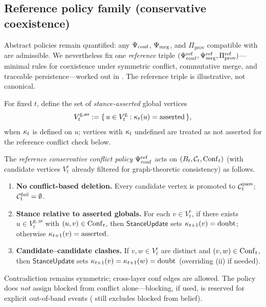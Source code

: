\subsection{Reference policy family (conservative coexistence)}
\label{sec:reference-policies}

Abstract policies remain quantified: any $\Psi_{\mathrm{conf}}$, $\Psi_{\mathrm{mrg}}$, and $\Pi_{\mathrm{prov}}$ compatible with  are admissible.
We nevertheless fix one \emph{reference} triple $(\Psi_{\mathrm{conf}}^{\mathrm{ref}},\Psi_{\mathrm{mrg}}^{\mathrm{ref}},\Pi_{\mathrm{prov}}^{\mathrm{ref}})$---minimal rules for coexistence under symmetric conflict, commutative merge, and traceable persistence---worked out in .
The reference triple is illustrative, not canonical.

\begin{definition}
\label{def:asserted-globals}
For fixed $t$, define the set of \emph{stance-asserted} global vertices
\[
  V^{\mathrm{g,as}}_t := \{\, u\in V^{\mathrm{g}}_t : \kappa_t(u)=\mathrm{asserted}\,\},
\]
when $\kappa_t$ is defined on $u$; vertices with $\kappa_t$ undefined are treated as not asserted for the reference conflict check below.
\end{definition}

\begin{definition}
\label{def:ref-conflict}
The \emph{reference conservative conflict policy} $\Psi_{\mathrm{conf}}^{\mathrm{ref}}$ acts on $(B_t,\mathcal{C}_t,\mathrm{Conf}_t)$ (with candidate vertices $V^{\mathrm{c}}_t$ already filtered for graph-theoretic consistency) as follows.
\begin{enumerate}[label=(\roman*),leftmargin=*]
  \item \textbf{No conflict-based deletion.} Every candidate vertex is promoted to $\mathcal{C}^{\mathrm{pass}}_t$; $\mathcal{C}^{\mathrm{fail}}_t=\emptyset$.
  \item \textbf{Stance relative to asserted globals.} For each $v\in V^{\mathrm{c}}_t$, if there exists $u\in V^{\mathrm{g,as}}_t$ with $(u,v)\in\mathrm{Conf}_t$, then $\mathsf{StanceUpdate}$ sets $\kappa_{t+1}(v)=\mathrm{doubt}$; otherwise $\kappa_{t+1}(v)=\mathrm{asserted}$.
  \item \textbf{Candidate--candidate clashes.} If $v,w\in V^{\mathrm{c}}_t$ are distinct and $(v,w)\in\mathrm{Conf}_t$, then $\mathsf{StanceUpdate}$ sets $\kappa_{t+1}(v)=\kappa_{t+1}(w)=\mathrm{doubt}$ (overriding (ii) if needed).
\end{enumerate}
Contradiction remains symmetric; cross-layer $\mathrm{conf}$ edges are allowed.
The policy does \emph{not} assign $\mathrm{blocked}$ from conflict alone---blocking, if used, is reserved for explicit out-of-band events ( still excludes $\mathrm{blocked}$ from belief).
\end{definition}

